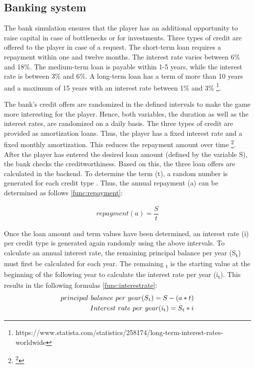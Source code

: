 \subsection{Banking system}

The bank simulation ensures that the player has an additional opportunity to raise capital in case of bottlenecks or for investments. Three types of credit are offered to the player in case of a request. 
The short-term loan requires a repayment within one and twelve months. The interest rate varies between 6\% and 18\%. The medium-term loan is payable within 1-5 years, while the interest rate is between 3\% and 6\%. A long-term loan has a term of more than 10 years and a maximum of 15 years with an interest rate between 1\% and 3\% \footnote{https://www.statista.com/statistics/258174/long-term-interest-rates-worldwide}. 

The bank's credit offers are randomized in the defined intervals to make the game more interesting for the player. Hence, both variables, the duration as well as the interest rates, are randomized on a daily basis. The three types of credit are provided as amortization loans. Thus, the player has a fixed interest rate and a fixed monthly amortization. This reduces the repayment amount over time \footnote{\footnote{https://www.investopedia.com/terms/a/amortized\_loan.asp}}.
After the player has entered the desired loan amount (defined by the variable S), the bank checks the creditworthiness. Based on this, the three loan offers are calculated in the backend. To determine the term (t), a random number is generated for each credit type . Thus, the annual repayment (a) can be determined as follows \ref{func:repayment}:

\begin{equation}
\label{func:repayment}
\begin{aligned}
repayment (a)= {\dfrac{S}{t}}
\end{aligned}    
\end{equation}

Once the loan amount and term values have been determined, an interest rate (i) per credit type is generated again randomly using the above intervals. To calculate an annual interest rate, the remaining principal balance per year (S\textsubscript{t}) must first be calculated for each year. The remaining \textsubscript{t}  is the starting value at the beginning of the following year to calculate the interest rate per year (i\textsubscript{t}). This results in the following formulas \ref{func:interestrate}:
\begin{equation}
\label{func:interestrate}
\begin{aligned}
principal \ balance \ per \ year (S\textsubscript{t})= S- (a*t)\\
Interest \ rate \ per \ year (i\textsubscript{t}) = S\textsubscript{t} * i
\end{aligned}    
\end{equation}

